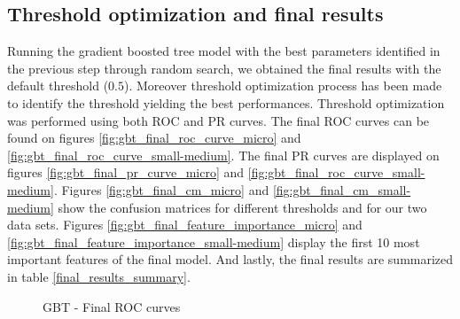 \documentclass[LaM,binding=0.6cm, english]{sapthesis}
\begin{document}
\subsection{Threshold optimization and final results}

Running the gradient boosted tree model with the best parameters identified in the previous step through random search, we obtained the final results with the default threshold ($0.5$). Moreover threshold optimization process has been made to identify the threshold yielding the best performances. Threshold optimization was performed using both ROC and PR curves. The final ROC curves can be found on figures \ref{fig:gbt_final_roc_curve_micro} and \ref{fig:gbt_final_roc_curve_small-medium}. The final PR curves are displayed on figures \ref{fig:gbt_final_pr_curve_micro} and \ref{fig:gbt_final_roc_curve_small-medium}. Figures \ref{fig:gbt_final_cm_micro} and \ref{fig:gbt_final_cm_small-medium} show the confusion matrices for different thresholds and for our two data sets. Figures \ref{fig:gbt_final_feature_importance_micro} and \ref{fig:gbt_final_feature_importance_small-medium} display the first 10 most important features of the final model. And lastly, the final results are summarized in table \ref{final_results_summary}.

\begin{figure}[!ht]
  \centering
  \hfill
  \caption{GBT - Final ROC curves}
\end{figure}
\end{document}
